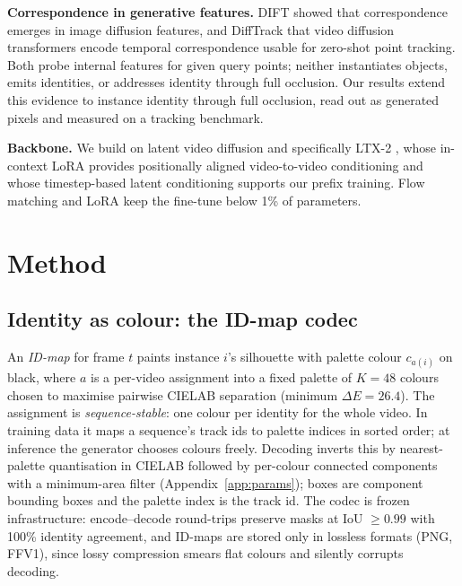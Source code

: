 \documentclass{article} %
\newcommand{\rev}[1]{{\color{blue}#1}}
\begin{document}
\textbf{Correspondence in generative features.} DIFT \citep{tang2023dift} showed that
correspondence emerges in image diffusion features, and DiffTrack \citep{nam2025difftrack}
that video diffusion transformers encode temporal correspondence usable for zero-shot
point tracking. \rev{Both probe internal features for given query points; neither
instantiates objects, emits identities, or addresses identity through full occlusion.}
Our results extend this evidence to instance identity through full
occlusion, read out as generated pixels and measured on a tracking benchmark.

\textbf{Backbone.} We build on latent video diffusion \citep{rombach2022ldm,ho2022video}
and specifically LTX-2 \citep{hacohen2026ltx2,hacohen2024ltxvideo}, whose in-context LoRA
\citep{huang2024iclora} provides positionally aligned video-to-video conditioning and
whose timestep-based latent conditioning supports our prefix training. Flow matching
\citep{lipman2022flow} and LoRA \citep{hu2021lora} keep the fine-tune below 1\% of
parameters.

\section{Method}

\subsection{Identity as colour: the ID-map codec}
\label{sec:codec}

An \emph{ID-map} for frame $t$ paints instance $i$'s silhouette with palette colour
$c_{a(i)}$ on black, where $a$ is a per-video assignment into a fixed palette of $K{=}48$
colours chosen to maximise pairwise CIELAB separation (minimum $\Delta E = 26.4$). The
assignment is \emph{sequence-stable}: one colour per identity for the whole video. In
training data it maps a sequence's track ids to palette indices in sorted order; at
inference the generator chooses colours freely. Decoding inverts this by nearest-palette
quantisation in CIELAB followed by per-colour connected components with a minimum-area
filter (Appendix~\ref{app:params}); boxes are component bounding boxes and the palette
index is the track id. The codec
is frozen infrastructure: encode--decode round-trips preserve masks at IoU $\geq 0.99$ with
100\% identity agreement, and ID-maps are stored only in lossless formats (PNG, FFV1),
since lossy compression smears flat colours and silently corrupts decoding.
\end{document}
